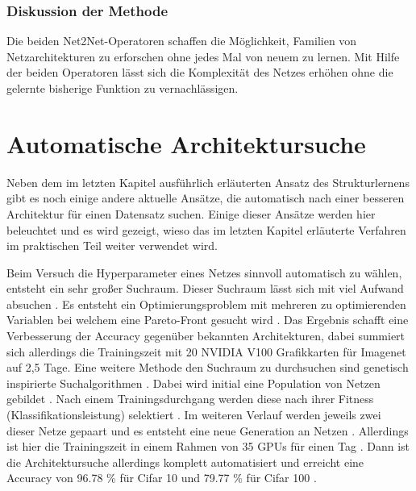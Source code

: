 \subsubsection{Diskussion der Methode}

Die beiden Net2Net-Operatoren schaffen die Möglichkeit, Familien von Netzarchitekturen zu erforschen ohne jedes Mal von neuem zu lernen. Mit Hilfe der beiden Operatoren lässt sich die Komplexität des Netzes erhöhen ohne die gelernte bisherige Funktion zu vernachlässigen.




\section{Automatische Architektursuche}\label{sec:auto}
Neben dem im letzten Kapitel ausführlich erläuterten Ansatz des Strukturlernens gibt es noch einige andere aktuelle Ansätze, die automatisch nach einer besseren Architektur für einen Datensatz suchen. Einige dieser Ansätze werden hier beleuchtet und es wird gezeigt, wieso das im letzten Kapitel erläuterte Verfahren im praktischen Teil weiter verwendet wird.

Beim Versuch die Hyperparameter eines Netzes sinnvoll automatisch zu wählen, entsteht ein sehr großer Suchraum. Dieser Suchraum lässt sich mit viel Aufwand absuchen \cite{dvolver}. Es entsteht ein Optimierungsproblem mit mehreren zu optimierenden Variablen bei welchem eine Pareto-Front gesucht wird \cite{dvolver}. Das Ergebnis schafft eine Verbesserung der Accuracy gegenüber bekannten Architekturen, dabei summiert sich allerdings die Trainingszeit mit 20 NVIDIA V100 Grafikkarten für Imagenet auf 2,5 Tage\cite{dvolver}.
Eine weitere Methode den Suchraum zu durchsuchen sind genetisch inspirierte Suchalgorithmen \cite{gen}. Dabei wird initial eine Population von Netzen gebildet \cite{gen}. Nach einem Trainingsdurchgang werden diese nach ihrer Fitness (Klassifikationsleistung) selektiert \cite{gen}. Im weiteren Verlauf werden jeweils zwei dieser Netze gepaart und es entsteht eine neue Generation an Netzen \cite{gen}. Allerdings ist hier die Trainingszeit in einem Rahmen von 35 GPUs für einen Tag \cite{gen}. Dann ist die Architektursuche allerdings komplett automatisiert und erreicht eine Accuracy von 96.78 \% für Cifar 10 und 79.77 \% für Cifar 100 \cite{gen}.   

